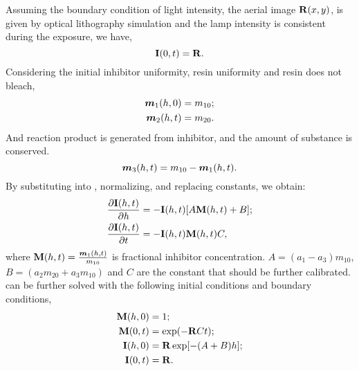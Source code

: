 Assuming the boundary condition of light intensity, the aerial image ${\mathbf{R}}(x,y)$, is given by optical lithography simulation and the lamp intensity is consistent during the exposure, we have,
\begin{equation}
    {\mathbf{I}}(0,t) = {\mathbf{R}}. \label{eq:aerial}
\end{equation}
Considering the initial inhibitor uniformity, resin uniformity and resin does not bleach,
\begin{equation}
\begin{aligned}
    {\bm{m}}_1(h,0) &= m_{10}; \\
    {\bm{m}}_2(h,t) &= m_{20}. \label{eq:init}
\end{aligned}
\end{equation}
And reaction product is generated from inhibitor, and the amount of substance is conserved.
\begin{equation}
    {\bm{m}}_3(h,t) = m_{10} - {\bm{m}}_1(h,t). \label{eq:amount}
\end{equation}
By substituting  into , normalizing, and replacing constants, we obtain:
\begin{equation}
\begin{aligned}
    \frac{\partial {\mathbf{I}}(h,t)}{\partial h} &= -{\mathbf{I}}(h,t)[A{\mathbf{M}}(h,t) + B]; \\
    \frac{\partial {\mathbf{I}}(h,t)}{\partial t} &= -{\mathbf{I}}(h,t) {\mathbf{M}}(h,t)C, \label{eq:expo}
\end{aligned}
\end{equation}
where ${\mathbf{M}}(h,t) = \frac{{\bm{m}}_1(h,t)}{m_{10}}$ is fractional inhibitor concentration. $A = (a_1-a_3)m_{10}$, $B = (a_2m_{20} + a_3m_{10})$ and $C$ are the constant that should be further calibrated.  can be further solved with the following initial conditions and boundary conditions,
\begin{equation}
    \begin{aligned}
        {\mathbf{M}}(h,0) &= 1; \\
        {\mathbf{M}}(0,t) &= \exp(-{\mathbf{R}} C t);\\
        {\mathbf{I}}(h,0) &= {\mathbf{R}}\exp[-(A + B)h];\\
        {\mathbf{I}}(0,t) &= {\mathbf{R}}.\label{eq:condition}
    \end{aligned}
\end{equation}


